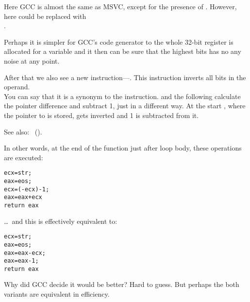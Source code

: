 Here GCC is almost the same as MSVC, except for the presence of \MOVZX.
However, here \MOVZX could be replaced with\\
.

Perhaps it is simpler for GCC's code generator to  
the whole 32-bit \EDX register 
is allocated for a \Tchar variable and it then can be sure that the highest bits has no any noise 
at any point.

\label{strlen_NOT_ADD}

After that we also see a new instruction---\NOT. This instruction inverts all bits in the operand. \\
You can say that it is a synonym to the  instruction. 
\NOT and the following \ADD calculate the pointer difference and subtract 1, just in a different way. 
At the start \ECX, where the pointer to  is stored, gets inverted and 1 is subtracted from it.

See also: \q{\SignedNumbersSectionName}~().
 
In other words, at the end of the function just after loop body, these operations are executed:

\begin{lstlisting}
ecx=str;
eax=eos;
ecx=(-ecx)-1; 
eax=eax+ecx
return eax
\end{lstlisting}

\dots~and this is effectively equivalent to:

\begin{lstlisting}
ecx=str;
eax=eos;
eax=eax-ecx;
eax=eax-1;
return eax
\end{lstlisting}

Why did GCC decide it would be better? Hard to guess. 
But perhaps the both variants are equivalent in efficiency.
